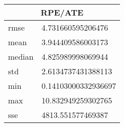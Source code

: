 \begin{table}[!ht] 
 \centering 
 \begin{tabular}{|l|l|} \hline 
 \multicolumn{2}{|c|}{RPE/ATE} \\ \hline 
 rmse & 4.731660595206476 \\ \hline 
mean & 3.944409586003173 \\ \hline 
median & 4.825989998069944 \\ \hline 
std & 2.6134737431388113 \\ \hline 
min & 0.14103000332936697 \\ \hline 
max & 10.832949259302765 \\ \hline 
sse & 4813.551577469387 \\ \hline 
\end{tabular} 
 \end{table}